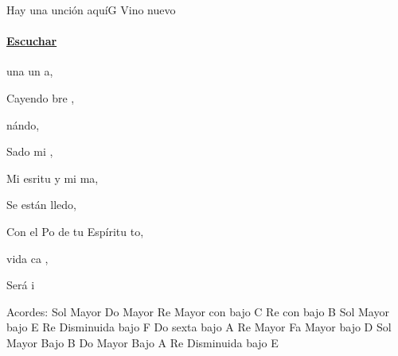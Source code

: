 \documentclass[12pt, spanish]{book}
\begin{document}
    \begin{song}{Hay una unción aquí}{G}
    {} %
    {Vino nuevo}
    {} %
    {}
        \ifChordBk
        \paragraph{\mbox{}\hfill\protect\href{https://open.spotify.com/intl-es/track/56rDFk9iYRwJsDDSRgCGeY}{Escuchar}\mbox{}\hfill}
        \fi

        \begin{SBOpGroup}
             una un a,

            Cayendo bre ,

            nándo,

            Sado mi ,
        \end{SBOpGroup}

        \begin{SBChorus}
            Mi esritu y mi ma,

            Se están lledo,

            Con el Po de tu Espíritu to,

             vida ca ,

            Será i
        \end{SBChorus}

        \ifChordBk
        \begin{SBOpGroup}
            Acordes:
            \upchord{\G}\qquad Sol Mayor \hfill
            \upchord{\C}\qquad Do Mayor \hfill\null\break
            \upchord{\DC}\qquad Re Mayor con bajo C \hfill
            \upchord{\DB}\qquad\qquad Re con bajo B \hfill\null\break
            \upchord{\GE}\qquad Sol Mayor bajo E \hfill
            \upchord{\DdimF}Re Disminuida bajo F \hfill\null\break
            \upchord{\CsixA}Do sexta bajo A \hfill
            \upchord{\D}\qquad Re Mayor \hfill\null\break
            \upchord{\FD}\qquad Fa Mayor bajo D \hfill
            \upchord{\GB}\qquad Sol Mayor Bajo B \hfill\null\break
            \upchord{\CA}\qquad Do Mayor Bajo A  \hfill
            \upchord{\DdimE}Re Disminuida bajo E \hfill\null\break
        \end{SBOpGroup}
        \fi
    \end{song}
\end{document}
